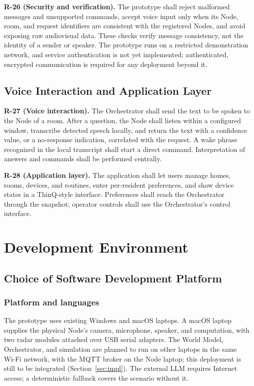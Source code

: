 \documentclass[conference]{IEEEtran}
\begin{document}
\textbf{R-26 (Security and verification).}
The prototype shall reject malformed messages and unsupported
commands, accept voice input only when its Node, room, and request
identifiers are consistent with the registered Nodes, and avoid
exposing raw audiovisual data. These checks verify message
consistency, not the identity of a sender or speaker. The prototype
runs on a restricted demonstration network, and service
authentication is not yet implemented; authenticated, encrypted
communication is required for any deployment beyond it.

\subsection{Voice Interaction and Application Layer}

\textbf{R-27 (Voice interaction).}
The Orchestrator shall send the text to be spoken to the Node of a
room. After a question, the Node shall listen within a configured
window, transcribe detected speech locally, and return the text
with a confidence value, or a no-response indication, correlated
with the request. A wake phrase recognized in the local transcript
shall start a direct command. Interpretation of answers and
commands shall be performed centrally.

\textbf{R-28 (Application layer).}
The application shall let users manage homes, rooms, devices, and
routines, enter per-resident preferences, and show device states in
a ThinQ-style interface. Preferences shall reach the Orchestrator
through the snapshot; operator controls shall use the
Orchestrator's control interface.

\section{Development Environment}
\label{sec:env}

\subsection{Choice of Software Development Platform}

\subsubsection{Platform and languages}

The prototype uses existing Windows and macOS laptops. A macOS
laptop supplies the physical Node's camera, microphone, speaker,
and computation, with two radar modules attached over USB serial
adapters. The World Model, Orchestrator, and simulation are planned
to run on other laptops in the same Wi-Fi network, with the MQTT
broker on the Node laptop; this deployment is still to be
integrated (Section~\ref{sec:impl}). The external LLM requires Internet access; a deterministic
fallback covers the scenario without it.
\end{document}
